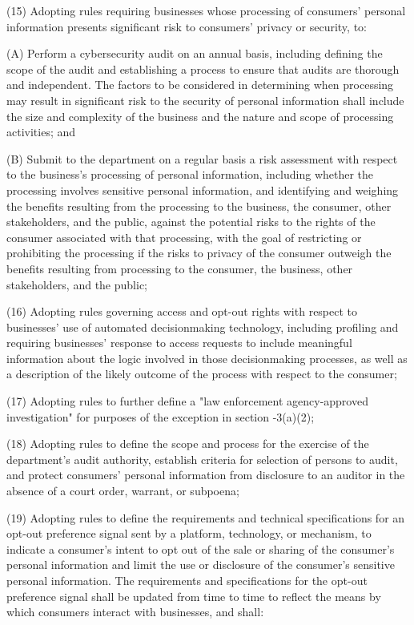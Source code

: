     (15)  Adopting rules requiring businesses whose processing of consumers' personal information presents significant risk to consumers' privacy or security, to:

          (A)  Perform a cybersecurity audit on an annual basis, including defining the scope of the audit and establishing a process to ensure that audits are thorough and independent.  The factors to be considered in determining when processing may result in significant risk to the security of personal information shall include the size and complexity of the business and the nature and scope of processing activities; and

          (B)  Submit to the department on a regular basis a risk assessment with respect to the business's processing of personal information, including whether the processing involves sensitive personal information, and identifying and weighing the benefits resulting from the processing to the business, the consumer, other stakeholders, and the public, against the potential risks to the rights of the consumer associated with that processing, with the goal of restricting or prohibiting the processing if the risks to privacy of the consumer outweigh the benefits resulting from processing to the consumer, the business, other stakeholders, and the public;

    (16)  Adopting rules governing access and opt-out rights with respect to businesses' use of automated decisionmaking technology, including profiling and requiring businesses' response to access requests to include meaningful information about the logic involved in those decisionmaking processes, as well as a description of the likely outcome of the process with respect to the consumer;

    (17)  Adopting rules to further define a "law enforcement agency-approved investigation" for purposes of the exception in section    -3(a)(2);

    (18)  Adopting rules to define the scope and process for the exercise of the department's audit authority, establish criteria for selection of persons to audit, and protect consumers' personal information from disclosure to an auditor in the absence of a court order, warrant, or subpoena;

    (19)  Adopting rules to define the requirements and technical specifications for an opt-out preference signal sent by a platform, technology, or mechanism, to indicate a consumer's intent to opt out of the sale or sharing of the consumer's personal information and limit the use or disclosure of the consumer's sensitive personal information.  The requirements and specifications for the opt-out preference signal shall be updated from time to time to reflect the means by which consumers interact with businesses, and shall:

